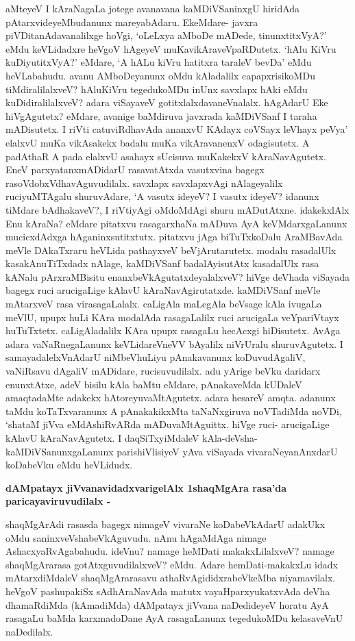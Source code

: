 aMteyeV I kAraNagaLa jotege avanavana kaMDiVSaninxgU hiridAda pAtarxvideyeMbudanunx mareyabAdaru. EkeMdare- javxra piVDitanAdavanalilxge hoVgi, `oLeLxya aMboDe mADede, tinunxtitxVyA?' eMdu keVLidadxre heVgoV hAgeyeV muKavikAraveVpaRDutetx. `hAlu KiVru kuDiyutitxVyA?' eMdare, `A hALu kiVru hatitxra taraleV bevDa' eMdu heVLabahudu. avanu AMboDeyanunx oMdu kAladalilx capapxrisikoMDu tiMdiralilalxveV? hAluKiVru tegedukoMDu inUnx savxlapx hAki eMdu kuDidiralilalxveV? adara viSayaveV gotitxlalxdavaneVnalalx. hAgAdarU Eke hiVgAgutetx? eMdare, avanige baMdiruva javxrada kaMDiVSanf I taraha mADisutetx. I riVti catuviRdhavAda ananxvU KAdayx coVSayx leVhayx peVya' elalxvU muKa vikAsakekx badalu muKa vikAravanenxV odagisutetx. A padAthaR A pada elalxvU asahayx sUcisuva muKakekxV kAraNavAgutetx. EneV parxyatanxmADidarU rasavatAtxda vasutxvina bagegx rasoVdobxVdhavAguvudilalx. savxlapx savxlapxvAgi nAlageyalilx ruciyuMTAgalu shuruvAdare, `A vasutx ideyeV? I vasutx ideyeV? idanunx tiMdare bAdhakaveV?, I riVtiyAgi oMdoMdAgi shuru mADutAtxne. idakekxlAlx Enu kAraNa? eMdare pitatxvu rasagarxhaNa mADuva AyA keVMdarxgaLanunx mucicxdAdxga hAganinxsutitxtutx. pitatxvu jAga biTuTxkoDalu AraMBavAda meVle DAkaTxraru heVLida pathayxveV beVjArutarutetx. modalu rasadalUlx kasakAnuTiTxdadx nAlage, kaMDiVSanf badalAyisutAtx kasadalUlx rasa kANalu pArxraMBisitu enanxbeVkAgutatxdeyalalxveV? hiVge deVhada viSayada bagegx ruci arucigaLige kAlavU kAraNavAgirutatxde. kaMDiVSanf meVle mAtarxveV rasa virasagaLalalx. caLigAla maLegAla beVsage kAla ivugaLa meVlU, upupx huLi KAra modalAda rasagaLalilx ruci arucigaLa veYpariVtayx huTuTxtetx. caLigAladalilx KAra upupx rasagaLu hecAcxgi hiDisutetx. AvAga adara vaNaRnegaLanunx keVLidareVneVV bAyalilx niVrUralu shuruvAgutetx. I samayadalelxVnAdarU niMbeVhuLiyu pAnakavanunx koDuvudAgaliV, vaNiRsavu dAgaliV mADidare, rucisuvudilalx. adu yArige beVku daridarx enunxtAtxe, adeV bisilu kAla baMtu eMdare, pAnakaveMda kUDaleV amaqtadaMte adakekx hAtoreyuvaMtAgutetx. adara hesareV amqta. adanunx taMdu koTaTxvaranunx A pAnakakikxMta taNaNxgiruva noVTadiMda noVDi, `shataM jiVva eMdAshiRvARda mADuvaMtAguittx. hiVge ruci- arucigaLige kAlavU kAraNavAgutetx. I daqSiTxyiMdaleV kAla-deVsha-kaMDiVSanunxgaLanunx parishiVlisiyeV yAva viSayada vivaraNeyanAnxdarU koDabeVku eMdu heVLidudx.

{\bf dAMpatayx jiVvanavidadxvarigelAlx 1shaqMgAra rasa'da paricayaviruvudilalx -}

shaqMgArAdi rasasda bagegx nimageV vivaraNe koDabeVkAdarU adakUkx oMdu saninxveVshabeVkAguvudu. nAnu hAgaMdAga nimage AshacxyaRvAgabahudu. ideVnu? namage heMDati makakxLilalxveV? namage shaqMgArarasa gotAtxguvudilalxveV? eMdu. Adare hemDati-makakxLu idadx mAtarxdiMdaleV shaqMgArarasavu athaRvAgididxrabeVkeMba niyamavilalx. heVgoV pashupakiSx sAdhAraNavAda matutx vayaHparxyukatxvAda deVha dhamaRdiMda (kAmadiMda) dAMpatayx jiVvana naDedideyeV horatu AyA rasagaLu baMda karxmadoDane AyA rasagaLanunx tegedukoMDu kelasaveVnU naDedilalx.

